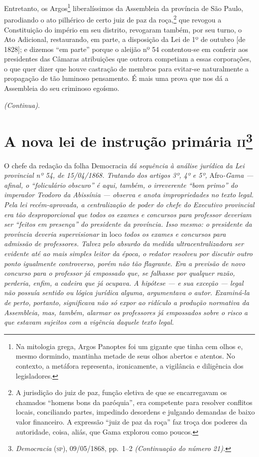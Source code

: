 Entretanto, os Argos\footnote{Na mitologia grega, Argos Panoptes foi
  um gigante que tinha cem olhos e, mesmo dormindo, mantinha metade de
  seus olhos abertos e atentos. No contexto, a metáfora representa,
  ironicamente, a vigilância e diligência dos legisladores.}
liberalíssimos da Assembleia da província de São Paulo, parodiando o ato
pilhérico de certo juiz de paz da roça,\footnote{A jurisdição do juiz
  de paz, função eletiva de que se encarregavam os chamados ``homens bons
  da paróquia'', era competente para resolver conflitos locais,
  conciliando partes, impedindo desordens e julgando demandas de baixo
  valor financeiro. A expressão ``juiz de paz da roça'' faz troça dos
  poderes da autoridade, coisa, aliás, que Gama explorou como poucos.}
que revogou a Constituição do império em seu distrito, revogaram também,
por seu turno, o Ato Adicional, restaurando, em parte, a disposição da
Lei de 1º de outubro {[}de 1828{]}; e dizemos ``em parte'' porque o
aleijão nº 54 contentou-se em conferir aos presidentes das Câmaras
atribuições que outrora competiam a essas corporações, o que quer dizer
que houve castração de membros para evitar-se naturalmente a propagação
de tão luminoso pensamento. É mais uma prova que nos dá a Assembleia do
seu criminoso egoísmo.

\emph{(Continua)}.

\chapter{A nova lei de instrução primária \textsc{ii}\footnote{\emph{Democracia} (\textsc{sp}), 09/05/1868, pp.~1--2 \emph{(Continuação do
  número 21).}}}

\begin{didascalia}
O chefe da redação da folha Democracia \emph{dá sequência à análise
jurídica da Lei provincial nº 54, de 15/04/1868. Tratando dos artigos
3º, 4º e 5º,} Afro\emph{-Gama --- afinal, o ``foliculário obscuro'' é
aqui, também, o irreverente ``bom primo'' do imperador Teodoro da
Abissínia --- observa e anota impropriedades no texto legal. Pela lei
recém-aprovada, a centralização de poder do chefe do Executivo
provincial era tão desproporcional que todos os exames e concursos para
professor deveriam ser ``feitos em presença'' do presidente da província.
Isso mesmo: o presidente da província deveria supervisionar} in loco
\emph{todos os exames e concursos para admissão de professores. Talvez
pelo absurdo da medida ultracentralizadora ser evidente até ao mais
simples leitor da época, o redator resolveu por discutir outro ponto
igualmente controverso, porém não tão flagrante. Era a previsão de novo
concurso para o professor já empossado que, se falhasse por qualquer
razão, perderia, enfim, a cadeira que já ocupava. A hipótese --- e sua
exceção --- legal não possuía sentido ou lógica jurídica alguma,
argumentava o autor. Examiná-la de perto, portanto, significava não só
expor ao ridículo a produção normativa da Assembleia, mas, também,
alarmar os professores já empossados sobre o risco a que estavam
sujeitos com a vigência daquele texto legal.}
\end{didascalia}



